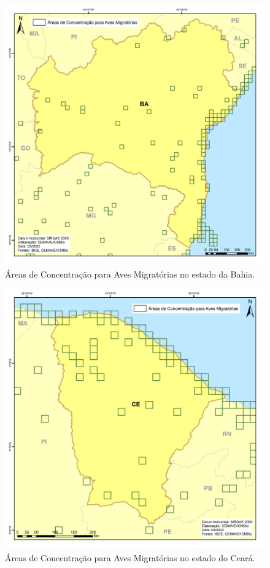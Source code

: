 \documentclass[
  oneside]{scrbook}
\begin{document}
\begin{figure}[H]

{\centering \includegraphics[width=0.75\linewidth]{imagens/cap07/Figura_7.12_BA} 

}

\caption{Áreas de Concentração para Aves Migratórias no estado da Bahia.}\label{fig:32}
\end{figure}

\begin{figure}[H]

{\centering \includegraphics[width=0.75\linewidth]{imagens/cap07/Figura_7.13_CE} 

}

\caption{Áreas de Concentração para Aves Migratórias no estado do Ceará.}\label{fig:33}
\end{figure}
\end{document}
